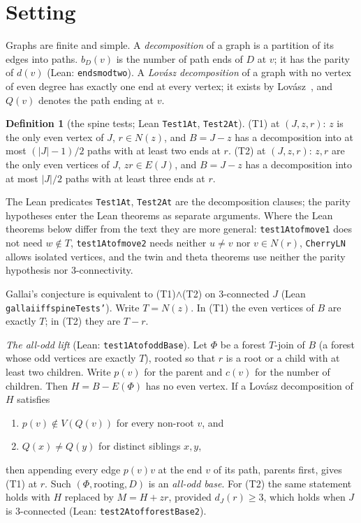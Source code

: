 \documentclass[11pt]{amsart}
\theoremstyle{definition}
\newtheorem{definition}[theorem]{Definition}
\theoremstyle{remark}
\renewcommand{\_}{\oldunderscore\allowbreak}
\newcommand{\lean}[1]{\textup{(Lean: {\small\texttt{#1}})}}
\begin{document}
\maketitle

\section{Setting}\label{sec:setting}

Graphs are finite and simple. A \emph{decomposition} of a graph is a partition of its edges into
paths. $b_D(v)$ is the number of path ends of $D$ at $v$; it has the parity of $d(v)$
\lean{ends\_mod\_two}. A \emph{Lov\'asz decomposition} of a graph with no vertex of even degree has
exactly one end at every vertex; it exists by Lov\'asz~\cite{L68}, and $Q(v)$ denotes the path
ending at $v$.

\begin{definition}[the spine tests; Lean \texttt{Test1At}, \texttt{Test2At}]
(T1) at $(J,z,r)$: $z$ is the only even vertex of $J$, $r\in N(z)$, and $B=J-z$ has a decomposition
into at most $(|J|-1)/2$ paths with at least two ends at $r$. (T2) at $(J,z,r)$: $z,r$ are the only
even vertices of $J$, $zr\in E(J)$, and $B=J-z$ has a decomposition into at most $|J|/2$ paths with
at least three ends at $r$.
\end{definition}

The Lean predicates \texttt{Test1At}, \texttt{Test2At} are the decomposition clauses; the parity
hypotheses enter the Lean theorems as separate arguments. Where the Lean theorems below differ from the
text they are more general: \texttt{test1At\_of\_move1} does not need $w\notin T$,
\texttt{test1At\_of\_move2} needs neither $u\ne v$ nor $v\in N(r)$, \texttt{CherryLN} allows
isolated vertices, and the twin and theta theorems use neither the parity hypothesis nor
$3$-connectivity.

Gallai's conjecture is equivalent to (T1)$\wedge$(T2) on $3$-connected $J$
\cite{SPINE} (Lean \texttt{gallai\_iff\_spineTests'}). Write $T=N(z)$. In (T1) the even vertices of
$B$ are exactly $T$; in (T2) they are $T-r$.

\emph{The all-odd lift} \cite[Theorem~7.1]{T2} \lean{test1At\_of\_oddBase}. Let $\Phi$ be a forest
$T$-join of $B$ (a forest whose odd vertices are exactly $T$), rooted so that $r$ is a root or a
child with at least two children. Write $p(v)$ for the parent and $c(v)$ for the number of
children. Then $H=B-E(\Phi)$ has no even vertex. If a Lov\'asz decomposition of $H$ satisfies
\begin{enumerate}[label=(\roman*)]
\item $p(v)\notin V(Q(v))$ for every non-root $v$, and
\item $Q(x)\neq Q(y)$ for distinct siblings $x,y$,
\end{enumerate}
then appending every edge $p(v)v$ at the end $v$ of its path, parents first, gives (T1) at $r$. Such
$(\Phi,\text{rooting},D)$ is an \emph{all-odd base}. For (T2) the same statement holds with $H$
replaced by $M=H+zr$, provided $d_J(r)\ge3$, which holds when $J$ is $3$-connected
\cite[Theorem~4.5]{T2} \lean{test2At\_of\_forestBase2}.
\end{document}
